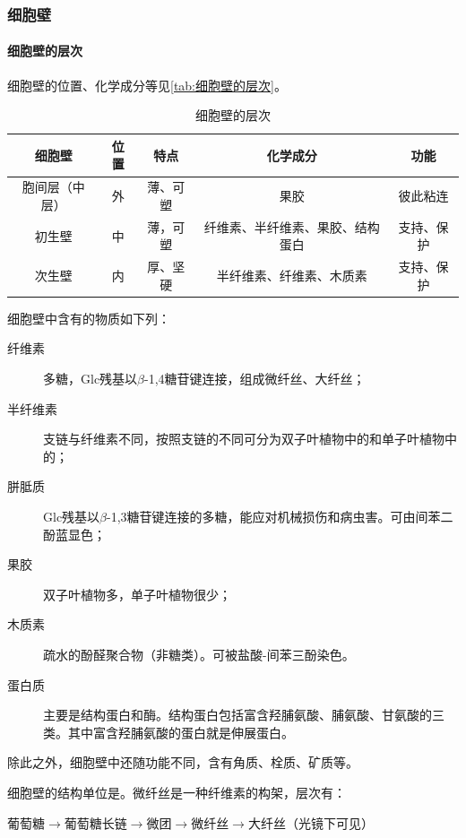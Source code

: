 \subsubsection{细胞壁}

\paragraph{细胞壁的层次}

细胞壁的位置、化学成分等见\autoref{tab:细胞壁的层次}。

\begin{table}[htbp]
\centering
\begin{tabularx}{\textwidth}{|c|c|c|C|c|}
	\hline
	\textbf{细胞壁} & \textbf{位置} & \textbf{特点} & \textbf{化学成分} & \textbf{功能} \\ \hline
	胞间层（中层） & 外 & 薄、可塑 & 果胶 & 彼此粘连 \\ \hline
	初生壁 & 中 & 薄，可塑 & 纤维素、半纤维素、果胶、结构蛋白 & 支持、保护 \\ \hline
	次生壁 & 内 & 厚、坚硬 & 半纤维素、纤维素、木质素 & 支持、保护 \\ \hline
\end{tabularx}
\caption{细胞壁的层次}
\label{tab:细胞壁的层次}
\end{table}

细胞壁中含有的物质如下列：
\begin{description}
	\item[纤维素] 多糖，Glc残基以$\beta$-1,4糖苷键连接，组成微纤丝、大纤丝；
	\item[半纤维素] 支链与纤维素不同，按照支链的不同可分为双子叶植物中的和单子叶植物中的；
	\item[胼胝质] Glc残基以$\beta$-1,3糖苷键连接的多糖，能应对机械损伤和病虫害。可由间苯二酚蓝显色；
	\item[果胶] 双子叶植物多，单子叶植物很少；
	\item[木质素] 疏水的酚醛聚合物（非糖类）。可被盐酸-间苯三酚染色。
	\item[蛋白质] 主要是结构蛋白和酶。结构蛋白包括富含羟脯氨酸、脯氨酸、甘氨酸的三类。其中富含羟脯氨酸的蛋白就是伸展蛋白。
\end{description}

除此之外，细胞壁中还随功能不同，含有角质、栓质、矿质等。

细胞壁的结构单位是。微纤丝是一种纤维素的构架，层次有：
\begin{center}
	葡萄糖$\longrightarrow$葡萄糖长链$\longrightarrow$微团$\longrightarrow$微纤丝$\longrightarrow$大纤丝（光镜下可见）
\end{center}

